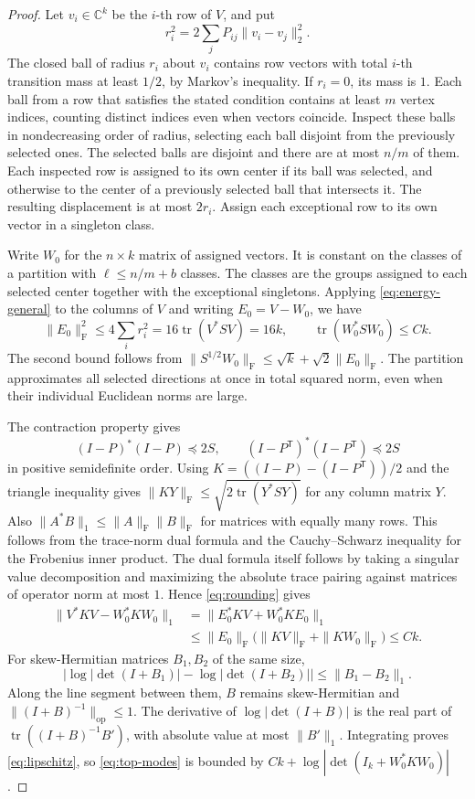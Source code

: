 \documentclass[11pt]{article}
\DeclareMathOperator{\tr}{tr}
\newcommand{\op}{\mathrm{op}}
\newcommand{\Frob}{\mathrm{F}}
\newcommand{\trans}{\mathsf{T}}
\begin{document}
\begin{proof}
Let \(v_i\in\mathbb C^k\) be the \(i\)-th row of \(V\), and put
\[
 r_i^2=2\sum_j P_{ij}\|v_i-v_j\|_2^2 .
\]
The closed ball of radius \(r_i\) about \(v_i\) contains row vectors with total \(i\)-th transition mass at least \(1/2\), by Markov's inequality. If \(r_i=0\), its mass is \(1\). Each ball from a row that satisfies the stated condition contains at least \(m\) vertex indices, counting distinct indices even when vectors coincide. Inspect these balls in nondecreasing order of radius, selecting each ball disjoint from the previously selected ones. The selected balls are disjoint and there are at most \(n/m\) of them. Each inspected row is assigned to its own center if its ball was selected, and otherwise to the center of a previously selected ball that intersects it. The resulting displacement is at most \(2r_i\). Assign each exceptional row to its own vector in a singleton class.

Write \(W_0\) for the \(n\times k\) matrix of assigned vectors. It is constant on the classes of a partition with \(\ell\le n/m+b\) classes. The classes are the groups assigned to each selected center together with the exceptional singletons. Applying \eqref{eq:energy-general} to the columns of \(V\) and writing \(E_0=V-W_0\), we have
\begin{equation}\label{eq:rounding}
 \|E_0\|_{\Frob}^2\le4\sum_i r_i^2
       =16\tr(V^*SV)=16k,\qquad
 \tr(W_0^*SW_0)\le C k .
\end{equation}
The second bound follows from \(\|S^{1/2}W_0\|_{\Frob}\le\sqrt{k}+\sqrt{2}\|E_0\|_{\Frob}\). The partition approximates all selected directions at once in total squared norm, even when their individual Euclidean norms are large.

The contraction property gives
\[
 (I-P)^*(I-P)\preceq 2S,\qquad (I-P^{\trans})^*(I-P^{\trans})\preceq 2S
\]
in positive semidefinite order. Using \(K=((I-P)-(I-P^{\trans}))/2\) and the triangle inequality gives \(\|KY\|_{\Frob}\le\sqrt{2\tr(Y^*SY)}\) for any column matrix \(Y\). Also \(\|A^*B\|_1\le \|A\|_{\Frob}\|B\|_{\Frob}\) for matrices with equally many rows. This follows from the trace-norm dual formula and the Cauchy--Schwarz inequality for the Frobenius inner product. The dual formula itself follows by taking a singular value decomposition and maximizing the absolute trace pairing against matrices of operator norm at most \(1\). Hence \eqref{eq:rounding} gives
\begin{align*}
 \|V^*KV-W_0^*KW_0\|_1
 &=\|E_0^*KV+W_0^*KE_0\|_1\\
 &\le\|E_0\|_{\Frob}\bigl(\|KV\|_{\Frob}+\|KW_0\|_{\Frob}\bigr)
 \le C k.
\end{align*}
For skew-Hermitian matrices \(B_1,B_2\) of the same size,
\begin{equation}\label{eq:lipschitz}
 \left|\log|\det(I+B_1)|-\log|\det(I+B_2)|\right|\le\|B_1-B_2\|_1 .
\end{equation}
Along the line segment between them, \(B\) remains skew-Hermitian and \(\|(I+B)^{-1}\|_{\op}\le1\). The derivative of \(\log|\det(I+B)|\) is the real part of \(\tr((I+B)^{-1}B')\), with absolute value at most \(\|B'\|_1\). Integrating proves \eqref{eq:lipschitz}, so \eqref{eq:top-modes} is bounded by \(Ck+\log|\det(I_k+W_0^*KW_0)|\).


\end{proof}
\end{document}
